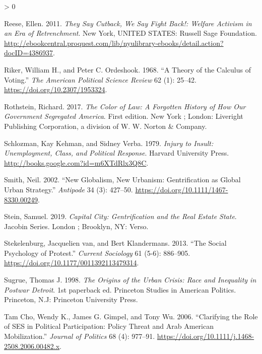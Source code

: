 \documentclass[
  12pt,
]{article}
\newlength{\cslhangindent}
\newenvironment{CSLReferences}[2] %
 {%
  \setlength{\parindent}{0pt}
  \ifodd #1 \everypar{\setlength{\hangindent}{\cslhangindent}}\ignorespaces\fi
  \ifnum #2 > 0
  \setlength{\parskip}{#2\baselineskip}
  \fi
 }%
 {}
\begin{document}
\begin{CSLReferences}{1}{0}
\leavevmode\hypertarget{ref-Reese2011}{}%
Reese, Ellen. 2011. \emph{They {Say Cutback}, {We Say Fight Back}!: {Welfare Activism} in an {Era} of {Retrenchment}}. {New York, UNITED STATES}: {Russell Sage Foundation}. \url{http://ebookcentral.proquest.com/lib/nyulibrary-ebooks/detail.action?docID=4386937}.

\leavevmode\hypertarget{ref-Riker1968}{}%
Riker, William H., and Peter C. Ordeshook. 1968. {``A {Theory} of the {Calculus} of {Voting}.''} \emph{The American Political Science Review} 62 (1): 25--42. \url{https://doi.org/10.2307/1953324}.

\leavevmode\hypertarget{ref-Rothstein2017}{}%
Rothstein, Richard. 2017. \emph{The Color of Law: A Forgotten History of How Our Government Segregated {America}}. First edition. {New York ; London}: {Liveright Publishing Corporation, a division of W. W. Norton \& Company}.

\leavevmode\hypertarget{ref-Schlozman1979}{}%
Schlozman, Kay Kehman, and Sidney Verba. 1979. \emph{Injury to {Insult}: {Unemployment}, {Class}, and {Political Response}}. {Harvard University Press}. \url{http://books.google.com?id=m6XTdRlx3Q8C}.

\leavevmode\hypertarget{ref-Smith2002}{}%
Smith, Neil. 2002. {``New {Globalism}, {New Urbanism}: {Gentrification} as {Global Urban Strategy}.''} \emph{Antipode} 34 (3): 427--50. \url{https://doi.org/10.1111/1467-8330.00249}.

\leavevmode\hypertarget{ref-Stein2019}{}%
Stein, Samuel. 2019. \emph{Capital City: Gentrification and the Real Estate State}. Jacobin Series. {London ; Brooklyn, NY}: {Verso}.

\leavevmode\hypertarget{ref-vanStekelenburg2013}{}%
Stekelenburg, Jacquelien van, and Bert Klandermans. 2013. {``The Social Psychology of Protest.''} \emph{Current Sociology} 61 (5-6): 886--905. \url{https://doi.org/10.1177/0011392113479314}.

\leavevmode\hypertarget{ref-Sugrue1998}{}%
Sugrue, Thomas J. 1998. \emph{The Origins of the Urban Crisis: Race and Inequality in Postwar {Detroit}}. 1st paperback ed. Princeton Studies in {American} Politics. {Princeton, N.J}: {Princeton University Press}.

\leavevmode\hypertarget{ref-TamCho2006a}{}%
Tam Cho, Wendy K., James G. Gimpel, and Tony Wu. 2006. {``Clarifying the {Role} of {SES} in {Political Participation}: {Policy Threat} and {Arab American Mobilization}.''} \emph{Journal of Politics} 68 (4): 977--91. \url{https://doi.org/10.1111/j.1468-2508.2006.00482.x}.


\end{CSLReferences}
\end{document}
